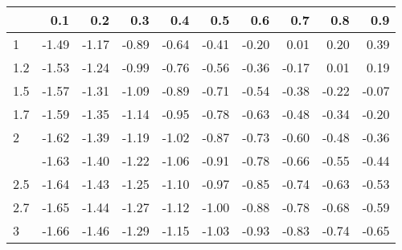 
\begin{tabular}{lrrrrrrrrr}
\toprule
  & 0.1 & 0.2 & 0.3 & 0.4 & 0.5 & 0.6 & 0.7 & 0.8 & 0.9\\
\midrule
1 & -1.49 & -1.17 & -0.89 & -0.64 & -0.41 & -0.20 & 0.01 & 0.20 & 0.39\\
1.2 & -1.53 & -1.24 & -0.99 & -0.76 & -0.56 & -0.36 & -0.17 & 0.01 & 0.19\\
1.5 & -1.57 & -1.31 & -1.09 & -0.89 & -0.71 & -0.54 & -0.38 & -0.22 & -0.07\\
1.7 & -1.59 & -1.35 & -1.14 & -0.95 & -0.78 & -0.63 & -0.48 & -0.34 & -0.20\\
2 & -1.62 & -1.39 & -1.19 & -1.02 & -0.87 & -0.73 & -0.60 & -0.48 & -0.36\\
\addlinespace
2.2 & -1.63 & -1.40 & -1.22 & -1.06 & -0.91 & -0.78 & -0.66 & -0.55 & -0.44\\
2.5 & -1.64 & -1.43 & -1.25 & -1.10 & -0.97 & -0.85 & -0.74 & -0.63 & -0.53\\
2.7 & -1.65 & -1.44 & -1.27 & -1.12 & -1.00 & -0.88 & -0.78 & -0.68 & -0.59\\
3 & -1.66 & -1.46 & -1.29 & -1.15 & -1.03 & -0.93 & -0.83 & -0.74 & -0.65\\
\bottomrule
\end{tabular}
